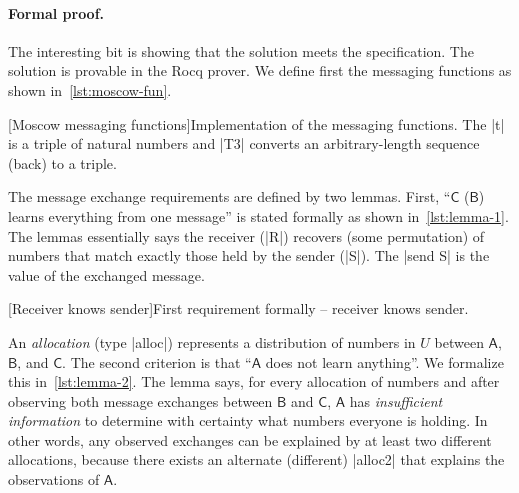 \paragraph{Formal proof.}
The interesting bit is showing that the solution meets the specification.
The solution is provable in the Rocq prover.
We define first the messaging functions as shown in~\autoref{lst:moscow-fun}.

\begin{center}
\begin{minipage}{\textwidth}
\captionsetup{type=lstlisting}
[Moscow messaging functions]{Implementation of the messaging functions. The \pr|t| is a triple of natural numbers and
\pr|T3| converts an arbitrary-length sequence (back) to a triple.}
\label{lst:moscow-fun}
\end{minipage}
\end{center}

The message exchange requirements are defined by two lemmas.
First, \enquote{\(\mathsf{C}\) (\resp \(\mathsf{B}\)) learns everything from one message} is stated formally as shown in~\autoref{lst:lemma-1}.
The lemmas essentially says the receiver (\pr|R|) recovers (some permutation) of numbers that match exactly those held by the sender (\pr|S|).
The \pr|send S| is the value of the exchanged message.

\begin{center}
\begin{minipage}{\textwidth}
\captionsetup{type=lstlisting}
[Receiver knows sender]{First requirement formally -- receiver knows sender.}
\label{lst:lemma-1}
\end{minipage}
\end{center}

An \emph{allocation} (type \pr|alloc|) represents a distribution of numbers in \(U\)
between \(\mathsf{A}\), \(\mathsf{B}\), and \(\mathsf{C}\).
The second criterion is that \enquote{\(\mathsf{A}\) does not learn anything}.
We formalize this in~\autoref{lst:lemma-2}.
The lemma says, for every allocation of numbers and after observing both message exchanges between \(\mathsf{B}\) and \(\mathsf{C}\),
\(\mathsf{A}\) has \emph{insufficient information}
to determine with certainty what numbers everyone is holding.
In other words, any observed exchanges can be explained by at least two different allocations,
because there exists an alternate (different) \pr|alloc2| that explains the observations of \(\mathsf{A}\).

